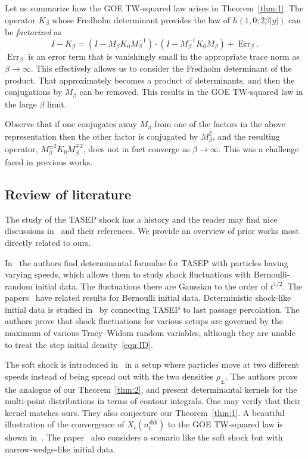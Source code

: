 \documentclass[AHL,Unicode,longabstracts]{cedram}
\DeclareMathOperator{\shk}{shk}
\DeclareMathOperator{\err}{Err}
\begin{document}
Let us summarize how the GOE TW-squared law arises in Theorem~\ref{thm:1}. The operator $K_{\beta}$ whose Fredholm determinant provides the law of $h(1,0;2\beta |y|)$ can be \emph{factorized} as
\[
I-K_{\beta} = (I - M_{\beta} K_0M^{-1}_{\beta}) \cdot (I - M^{-1}_{\beta} K_0 M_{\beta}) + \err_{\beta}.
\]
$\err_{\beta}$ is an error term that is vanishingly small in the appropriate trace norm as $\beta \to \infty$. This effectively allows us to consider the Fredholm determinant of the product. That approximately becomes a product of determinants, and then the conjugations by $M_{\beta}$ can be removed. This results in the GOE TW-squared law in the large $\beta$ limit.

Observe that if one conjugates away $M_{\beta}$ from one of the factors in the above representation then the other factor is conjugated by $M^2_{\beta}$, and the resulting operator, $M^{\pm2}_{\beta}K_0 M^{\mp2}_{\beta}$, does not in fact converge as $\beta \to \infty$. This was a challenge faced in previous works.

\subsection{Review of literature} \label{sec:lit}
The study of the TASEP shock has a history and the reader may find nice discussions in~\cite{F2, FFV} and their references. We provide an overview of prior works most directly related to ours.

In~\cite{BFS} the authors find determinantal formulae for TASEP with particles having varying speeds, which allows them to study shock fluctuations with Bernoulli-random initial data. The fluctuations there are Gaussian to the order of $t^{1/2}$. The papers~\cite{BC, CFP, FFV} have related results for Bernoulli initial data. Deterministic shock-like initial data is studied in~\cite{FN1, FN3} by connecting TASEP to last passage percolation. The authors prove that shock fluctuations for various setups are governed by the maximum of various Tracy--Widom random variables, although they are unable to treat the step initial density~\eqref{eqn:ID}.

The soft shock is introduced in~\cite{FN2} in a setup where particles move at two different speeds instead of being spread out with the two densities $\rho_{\pm}$. The authors prove the analogue of our Theorem~\ref{thm:2}, and present determinantal kernels for the multi-point distributions in terms of contour integrals. One may verify that their kernel matches ours. They also conjecture our Theorem~\ref{thm:1}. A beautiful illustration of the convergence of $X_t(n^{\shk}_t)$ to the GOE TW-squared law is shown in~\cite[Figure~1]{FN2}. The paper~\cite{N} also considers a scenario like the soft shock but with narrow-wedge-like initial data.
\end{document}

